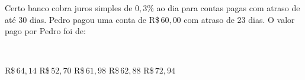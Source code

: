 \parbox{\linewidth}{

Certo banco cobra juros simples de $0{,}3$\% ao dia para contas pagas com atraso de até 30 dias. Pedro pagou uma conta de R\$\,$60{,}00$ com atraso de 23 dias. O valor pago por Pedro foi de:}\vspace{2mm}\\\parbox{\linewidth}{

R\$\,$64{,}14$
R\$\,$52{,}70$
R\$\,$61{,}98$
R\$\,$62{,}88$
R\$\,$72{,}94$

}

